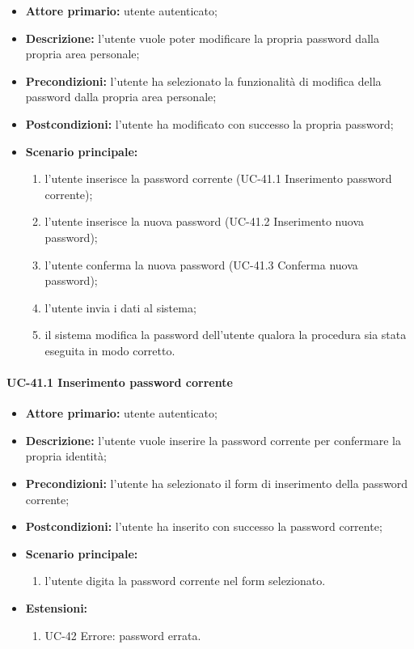 	\begin{itemize}
		\item \textbf{Attore primario:} utente autenticato;

		\item \textbf{Descrizione:}  l'utente vuole poter modificare la propria password dalla propria area personale;

		\item \textbf{Precondizioni:} l'utente ha selezionato la funzionalità di modifica della password dalla propria area personale;

		\item \textbf{Postcondizioni:} l'utente ha modificato con successo la propria password;

		\item \textbf{Scenario principale:}
	  		\begin{enumerate}
		  		\item l'utente inserisce la password corrente (UC-41.1 Inserimento password corrente);
		  		\item l'utente inserisce la nuova password (UC-41.2 Inserimento nuova password);
		  		\item l'utente conferma la nuova password (UC-41.3 Conferma nuova password);
		  		\item l'utente invia i dati al sistema;
		  		\item il sistema modifica la password dell'utente qualora la procedura sia stata eseguita in modo corretto.
	  		\end{enumerate}
	\end{itemize}

\paragraph{UC-41.1 Inserimento password corrente}

	\begin{itemize}
		\item \textbf{Attore primario:} utente autenticato;

		\item \textbf{Descrizione:} l'utente vuole inserire la password corrente per confermare la propria identità;

		\item \textbf{Precondizioni:} l'utente ha selezionato il form di inserimento della password corrente;

		\item \textbf{Postcondizioni:} l'utente ha inserito con successo la password corrente;

		\item \textbf{Scenario principale:}
	  		\begin{enumerate}
		  		\item l'utente digita la password corrente nel form selezionato.
	  		\end{enumerate}
		\item \textbf{Estensioni:}
			\begin{enumerate}
		  		\item UC-42 Errore: password errata.
	  		\end{enumerate}
	\end{itemize}

